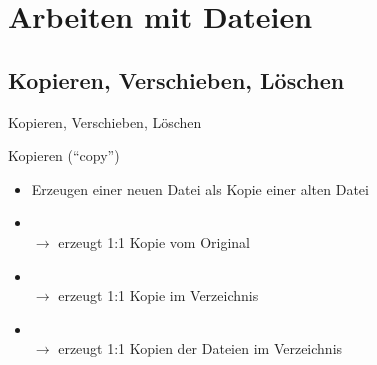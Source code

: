 \documentclass[aspectratio=43]{beamer}
\begin{document}
\section{Arbeiten mit Dateien}
\subsection{Kopieren, Verschieben, Löschen}
\begin{frame}{Kopieren, Verschieben, Löschen}
  \begin{block}{Kopieren ("`copy"')}
    \begin{itemize}
      \item Erzeugen einer neuen Datei als Kopie einer alten Datei
      \item {} \\ 
          $\rightarrow$ erzeugt 1:1 Kopie vom Original
      \item {} \\ 
          $\rightarrow$ erzeugt 1:1 Kopie im Verzeichnis
      \item {} \\ 
          $\rightarrow$ erzeugt 1:1 Kopien der Dateien im Verzeichnis
    \end{itemize}
  \end{block}
\end{frame}
\end{document}
